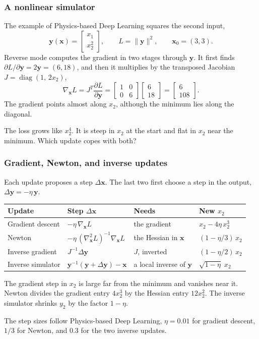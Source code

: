 \documentclass{beamer}
\DeclareMathOperator{\diag}{diag}
\begin{document}
\begin{frame}
\frametitle{A nonlinear simulator}
The example of Physics-based Deep Learning squares the second input,
\[
\mathbf y(\mathbf x)=\begin{bmatrix}x_1\\ x_2^2\end{bmatrix},\qquad L=\lVert\mathbf y\rVert^2,\qquad \mathbf x_0=(3,3).
\]
Reverse mode computes the gradient in two stages through $\mathbf y$.
It first finds $\partial L/\partial\mathbf y=2\mathbf y=(6,18)$, and then it multiplies by the transposed Jacobian $J=\diag(1,\,2x_2)$,
\[
\nabla_{\mathbf x}L=J^T\frac{\partial L}{\partial\mathbf y}
=\begin{bmatrix}1&0\\0&6\end{bmatrix}\begin{bmatrix}6\\18\end{bmatrix}
=\begin{bmatrix}6\\108\end{bmatrix}.
\]
The gradient points almost along $x_2$, although the minimum lies along the diagonal.
\bigskip

The loss grows like $x_2^4$.
It is steep in $x_2$ at the start and flat in $x_2$ near the minimum.
Which update copes with both?
\end{frame}

\begin{frame}
\frametitle{Gradient, Newton, and inverse updates}
Each update proposes a step $\Delta\mathbf x$.
The last two first choose a step in the output, $\Delta\mathbf y=-\eta\,\mathbf y$.
\begin{center}
\small
\begin{tabular}{llll}
\toprule
Update & Step $\Delta\mathbf x$ & Needs & New $x_2$\\
\midrule
Gradient descent & $-\eta\,\nabla_{\mathbf x}L$ & the gradient & $x_2-4\eta\,x_2^3$\\
Newton & $-\eta\,(\nabla^2_{\mathbf x}L)^{-1}\nabla_{\mathbf x}L$ & the Hessian in $\mathbf x$ & $(1-\eta/3)\,x_2$\\
Inverse gradient & $J^{-1}\Delta\mathbf y$ & $J$, inverted & $(1-\eta/2)\,x_2$\\
Inverse simulator & $\mathbf y^{-1}(\mathbf y+\Delta\mathbf y)-\mathbf x$ & a local inverse of $\mathbf y$ & $\sqrt{1-\eta}\;x_2$\\
\bottomrule
\end{tabular}
\end{center}
\medskip
The gradient step in $x_2$ is large far from the minimum and vanishes near it.
Newton divides the gradient entry $4x_2^3$ by the Hessian entry $12x_2^2$.
The inverse simulator shrinks $y_2$ by the factor $1-\eta$.
\medskip

The step sizes follow Physics-based Deep Learning, $\eta=0.01$ for gradient descent, $1/3$ for Newton, and $0.3$ for the two inverse updates.
\end{frame}
\end{document}
